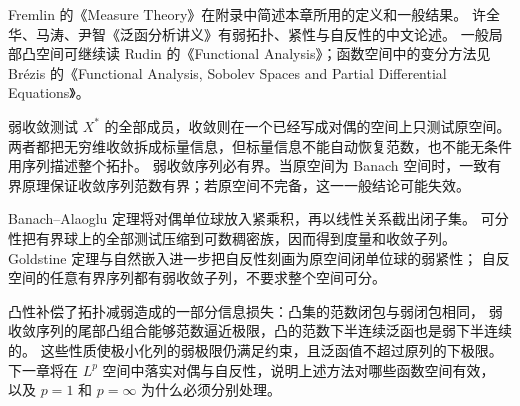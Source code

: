 \ProseParagraphBreak

Fremlin 的《Measure Theory》\cite[Appendix to Volume 2, \S2A5; Appendix to Volume 3, \S3A5]{Fremlin2016Measure}在附录中简述本章所用的定义和一般结果。
许全华、马涛、尹智《泛函分析讲义》\cite[第8--9章]{Xu2017Fanhan}有弱拓扑、\WeakStar{}紧性与自反性的中文论述。
一般局部凸空间可继续读 Rudin 的《Functional Analysis》\cite{Rudin1991Functional}；函数空间中的变分方法见 Brézis 的《Functional Analysis, Sobolev Spaces and Partial Differential Equations》\cite{Brezis2011Functional}。






\begin{chaptersummary}
弱收敛测试 \(X^*\) 的全部成员，\WeakStar{}收敛则在一个已经写成对偶的空间上只测试原空间。
两者都把无穷维收敛拆成标量信息，但标量信息不能自动恢复范数，也不能无条件用序列描述整个拓扑。
弱收敛序列必有界。当原空间为 Banach 空间时，一致有界原理保证\WeakStar{}收敛序列范数有界；若原空间不完备，这一一般结论可能失效。

\ProseParagraphBreak

Banach--Alaoglu 定理将对偶单位球放入紧乘积，再以线性关系截出闭子集。
可分性把有界球上的全部测试压缩到可数稠密族，因而得到度量和收敛子列。
Goldstine 定理与自然嵌入进一步把自反性刻画为原空间闭单位球的弱紧性；
自反空间的任意有界序列都有弱收敛子列，不要求整个空间可分。

\ProseParagraphBreak

凸性补偿了拓扑减弱造成的一部分信息损失：凸集的范数闭包与弱闭包相同，
弱收敛序列的尾部凸组合能够范数逼近极限，凸的范数下半连续泛函也是弱下半连续的。
这些性质使极小化列的弱极限仍满足约束，且泛函值不超过原列的下极限。
下一章将在 \(L^p\) 空间中落实对偶与自反性，说明上述方法对哪些函数空间有效，
以及 \(p=1\) 和 \(p=\infty\) 为什么必须分别处理。
\end{chaptersummary}


\BookExercises


